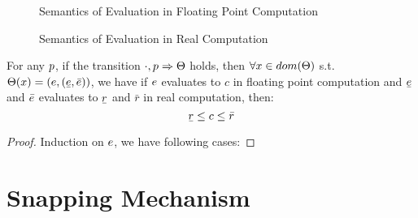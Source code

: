 \documentclass[a4paper,11pt]{article}
\begin{document}
\begin{figure}
\caption{Semantics of Evaluation in Floating Point Computation}
\label{fig_real_semantics_exp}
\end{figure}

\begin{figure}
\caption{Semantics of Evaluation in Real Computation}
\label{fig_real_semantics_exp}
\end{figure}


\begin{thm}
For any $p$, if the transition 
$\cdot, p \Rightarrow \Theta$ holds, 
then $\forall x \in dom(\Theta)$ s.t. $\trsenv(x) =(\expr, (\ubar{\expr}, \bar{\expr})) $, we have
if $e$ evaluates to $c$ in floating point computation and 
$\ubar{\expr}$ and $\bar{e}$ evaluates to $\ubar{r}$ and $\bar{r}$ in real computation, then: 
\[
\ubar{r} \leq c \leq \bar{r}
\]
\end{thm}
\begin{proof}
Induction on $e$, we have following cases:

\end{proof}

\newpage
\section{Snapping Mechanism}
\end{document}
